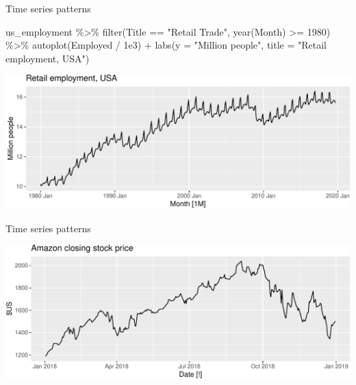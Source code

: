 \documentclass[14pt,ignorenonframetext,aspectratio=169]{beamer}
\newenvironment{Shaded}{\begin{snugshade}}{\end{snugshade}}
\newcommand{\AttributeTok}[1]{\textcolor[rgb]{0.77,0.63,0.00}{#1}}
\newcommand{\DecValTok}[1]{\textcolor[rgb]{0.00,0.00,0.81}{#1}}
\newcommand{\FloatTok}[1]{\textcolor[rgb]{0.00,0.00,0.81}{#1}}
\newcommand{\FunctionTok}[1]{\textcolor[rgb]{0.00,0.00,0.00}{#1}}
\newcommand{\NormalTok}[1]{#1}
\newcommand{\SpecialCharTok}[1]{\textcolor[rgb]{0.00,0.00,0.00}{#1}}
\newcommand{\StringTok}[1]{\textcolor[rgb]{0.31,0.60,0.02}{#1}}
\renewenvironment{Shaded}{\color{black}\begin{snugshade}\color{black}}{\end{snugshade}}
\renewenvironment{Shaded}{\color{black}\fontsize{10}{10}\sf\begin{snugshade}\color{black}}{\end{snugshade}}
\begin{document}
\begin{frame}[fragile]{Time series patterns}
\protect\hypertarget{time-series-patterns-3}{}
\fontsize{9}{9}\sf

\begin{Shaded}
\begin{Highlighting}[]
\NormalTok{us\_employment }\SpecialCharTok{\%\textgreater{}\%}
  \FunctionTok{filter}\NormalTok{(Title }\SpecialCharTok{==} \StringTok{"Retail Trade"}\NormalTok{, }\FunctionTok{year}\NormalTok{(Month) }\SpecialCharTok{\textgreater{}=} \DecValTok{1980}\NormalTok{) }\SpecialCharTok{\%\textgreater{}\%}
  \FunctionTok{autoplot}\NormalTok{(Employed }\SpecialCharTok{/} \FloatTok{1e3}\NormalTok{) }\SpecialCharTok{+}
  \FunctionTok{labs}\NormalTok{(}\AttributeTok{y =} \StringTok{"Million people"}\NormalTok{, }\AttributeTok{title =} \StringTok{"Retail employment, USA"}\NormalTok{)}
\end{Highlighting}
\end{Shaded}

\includegraphics{2-tsgraphics_files/figure-beamer/unnamed-chunk-9-1.pdf}
\end{frame}

\begin{frame}[fragile]{Time series patterns}
\protect\hypertarget{time-series-patterns-4}{}
\fontsize{9}{9}\sf

\begin{Shaded}
\end{Shaded}

\includegraphics{2-tsgraphics_files/figure-beamer/unnamed-chunk-10-1.pdf}
\end{frame}
\end{document}

